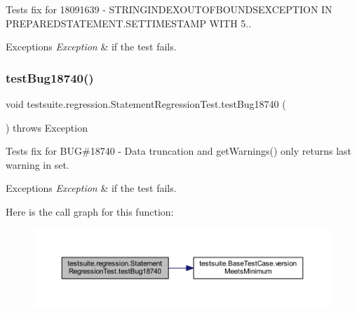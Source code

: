 Tests fix for 18091639 -\/ S\+T\+R\+I\+N\+G\+I\+N\+D\+E\+X\+O\+U\+T\+O\+F\+B\+O\+U\+N\+D\+S\+E\+X\+C\+E\+P\+T\+I\+ON IN P\+R\+E\+P\+A\+R\+E\+D\+S\+T\+A\+T\+E\+M\+E\+N\+T.\+S\+E\+T\+T\+I\+M\+E\+S\+T\+A\+MP W\+I\+TH 5..


\begin{DoxyExceptions}{Exceptions}
{\em Exception} & if the test fails. \\
\hline
\end{DoxyExceptions}
\mbox{\label{classtestsuite_1_1regression_1_1_statement_regression_test_ab6784623c76f1e2dcd68a61ca256af75}} 
\subsubsection{\texorpdfstring{test\+Bug18740()}{testBug18740()}}
{\footnotesize\ttfamily void testsuite.\+regression.\+Statement\+Regression\+Test.\+test\+Bug18740 (\begin{DoxyParamCaption}{ }\end{DoxyParamCaption}) throws Exception}

Tests fix for B\+UG\#18740 -\/ Data truncation and get\+Warnings() only returns last warning in set.


\begin{DoxyExceptions}{Exceptions}
{\em Exception} & if the test fails. \\
\hline
\end{DoxyExceptions}
Here is the call graph for this function\+:
\nopagebreak
\begin{figure}[H]
\begin{center}
\leavevmode
\includegraphics[width=350pt]{classtestsuite_1_1regression_1_1_statement_regression_test_ab6784623c76f1e2dcd68a61ca256af75_cgraph}
\end{center}
\end{figure}
\mbox{\label{classtestsuite_1_1regression_1_1_statement_regression_test_aee25d7d22ab4c6ef36bab834d6dacc99}} 
